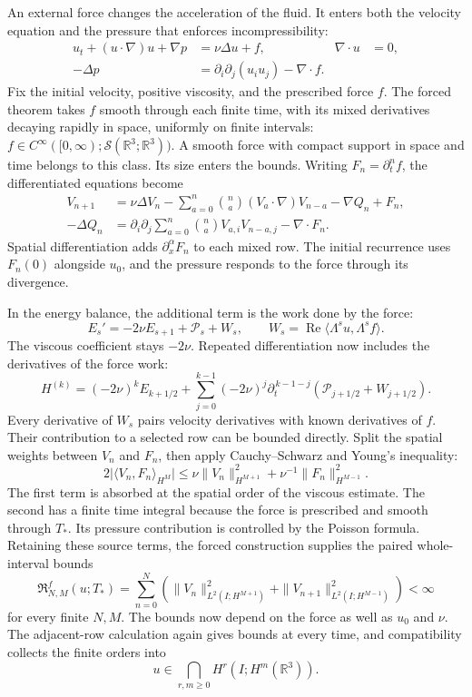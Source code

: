 An external force changes the acceleration of the fluid. It enters both
the velocity equation and the pressure that enforces incompressibility:
\[
 \begin{aligned}
 u_t+(u\cdot\nabla)u+\nabla p&=\nu\Delta u+f,
 &\nabla\cdot u&=0,\\
 -\Delta p&=\partial_i\partial_j(u_i u_j)-\nabla\cdot f.
 \end{aligned}
\]
Fix the initial velocity, positive viscosity, and the prescribed force
\(f\). The forced theorem takes \(f\) smooth through each finite
time, with its mixed derivatives decaying rapidly in space, uniformly on
finite intervals:
\(f\in C^\infty([0,\infty);\mathcal S(\mathbb R^3;\mathbb R^3))\).
A smooth force with compact support in space and time belongs to this
class. Its size enters the bounds. Writing \(F_n=\partial_t^nf\),
the differentiated equations become
\[
 \begin{aligned}
 V_{n+1}&=\nu\Delta V_n
 -\sum_{a=0}^{n}\binom na(V_a\cdot\nabla)V_{n-a}
 -\nabla Q_n+F_n,\\
 -\Delta Q_n&=\partial_i\partial_j
   \sum_{a=0}^{n}\binom na V_{a,i}V_{n-a,j}-\nabla\cdot F_n.
 \end{aligned}
\]
Spatial differentiation adds \(\partial_x^\alpha F_n\) to each mixed
row. The initial recurrence uses \(F_n(0)\) alongside \(u_0\), and
the pressure responds to the force through its divergence.

In the energy balance, the additional term is the work done by the force:
\[
 E_s'=-2\nu E_{s+1}+\mathcal P_s+W_s,
 \qquad
 W_s=\operatorname{Re}\langle\Lambda^su,\Lambda^sf\rangle.
\]
The viscous coefficient stays \(-2\nu\). Repeated differentiation
now includes the derivatives of the force work:
\[
 H^{(k)}=(-2\nu)^k E_{k+1/2}
 +\sum_{j=0}^{k-1}(-2\nu)^j
  \partial_t^{\,k-1-j}(\mathcal P_{j+1/2}+W_{j+1/2}).
\]
Every derivative of \(W_s\) pairs velocity derivatives with known
derivatives of \(f\). Their contribution to a selected row can be
bounded directly. Split the spatial weights between \(V_n\) and
\(F_n\), then apply Cauchy--Schwarz and Young's inequality:
\[
 2\bigl|\langle V_n,F_n\rangle_{H^M}\bigr|
 \le\nu\|V_n\|_{H^{M+1}}^2
      +\nu^{-1}\|F_n\|_{H^{M-1}}^2.
\]
The first term is absorbed at the spatial order of the viscous estimate.
The second has a finite time integral because the force is prescribed
and smooth through \(T_*\). Its pressure contribution is controlled by
the Poisson formula. Retaining these source terms, the forced construction
supplies the paired whole-interval bounds
\[
 \mathfrak R^f_{N,M}(u;T_*)
 =\sum_{n=0}^{N}\left(
 \|V_n\|_{L^2(I;H^{M+1})}^2
 +\|V_{n+1}\|_{L^2(I;H^{M-1})}^2\right)<\infty
\]
for every finite \(N,M\). The bounds now depend on the force as well
as \(u_0\) and \(\nu\). The adjacent-row calculation again gives
bounds at every time, and compatibility collects the finite orders into
\[
 u\in\bigcap_{r,m\ge0}H^r(I;H^m(\mathbb R^3)).
\]

